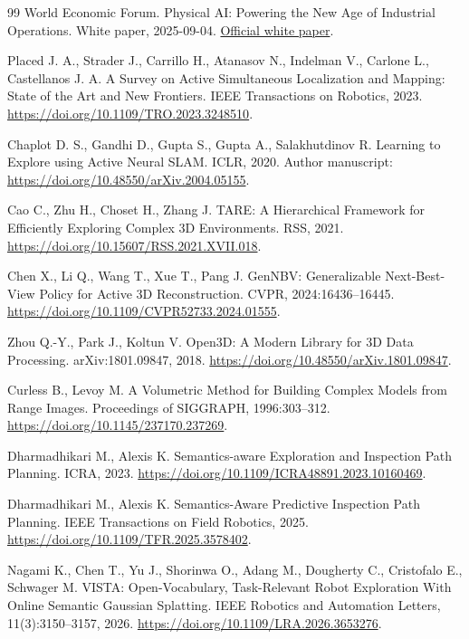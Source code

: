 \documentclass[pdflatex,sn-mathphys-num]{sn-jnl}
\begin{document}
\begin{thebibliography}{99}
 World Economic Forum. Physical AI: Powering the New Age of Industrial Operations. White paper, 2025-09-04. \href{https://www.weforum.org/publications/physical-ai-powering-the-new-age-of-industrial-operations/}{Official white paper}.

 Placed J. A., Strader J., Carrillo H., Atanasov N., Indelman V., Carlone L., Castellanos J. A. A Survey on Active Simultaneous Localization and Mapping: State of the Art and New Frontiers. IEEE Transactions on Robotics, 2023. \url{https://doi.org/10.1109/TRO.2023.3248510}.

 Chaplot D. S., Gandhi D., Gupta S., Gupta A., Salakhutdinov R. Learning to Explore using Active Neural SLAM. ICLR, 2020. Author manuscript: \url{https://doi.org/10.48550/arXiv.2004.05155}.

 Cao C., Zhu H., Choset H., Zhang J. TARE: A Hierarchical Framework for Efficiently Exploring Complex 3D Environments. RSS, 2021. \url{https://doi.org/10.15607/RSS.2021.XVII.018}.

 Chen X., Li Q., Wang T., Xue T., Pang J. GenNBV: Generalizable Next-Best-View Policy for Active 3D Reconstruction. CVPR, 2024:16436--16445. \url{https://doi.org/10.1109/CVPR52733.2024.01555}.

 Zhou Q.-Y., Park J., Koltun V. Open3D: A Modern Library for 3D Data Processing. arXiv:1801.09847, 2018. \url{https://doi.org/10.48550/arXiv.1801.09847}.

 Curless B., Levoy M. A Volumetric Method for Building Complex Models from Range Images. Proceedings of SIGGRAPH, 1996:303--312. \url{https://doi.org/10.1145/237170.237269}.

 Dharmadhikari M., Alexis K. Semantics-aware Exploration and Inspection Path Planning. ICRA, 2023. \url{https://doi.org/10.1109/ICRA48891.2023.10160469}.

 Dharmadhikari M., Alexis K. Semantics-Aware Predictive Inspection Path Planning. IEEE Transactions on Field Robotics, 2025. \url{https://doi.org/10.1109/TFR.2025.3578402}.

 Nagami K., Chen T., Yu J., Shorinwa O., Adang M., Dougherty C., Cristofalo E., Schwager M. VISTA: Open-Vocabulary, Task-Relevant Robot Exploration With Online Semantic Gaussian Splatting. IEEE Robotics and Automation Letters, 11(3):3150--3157, 2026. \url{https://doi.org/10.1109/LRA.2026.3653276}.


\end{thebibliography}
\end{document}
